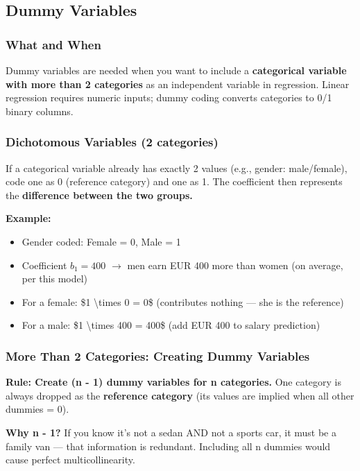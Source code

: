 \documentclass[12pt,openany]{book}
\begin{document}
\medskip


\subsection{Dummy Variables}


\subsubsection{What and When}


Dummy variables are needed when you want to include a \textbf{categorical variable with more than 2 categories} as an independent variable in regression. Linear regression requires numeric inputs; dummy coding converts categories to 0/1 binary columns.

\subsubsection{Dichotomous Variables (2 categories)}


If a categorical variable already has exactly 2 values (e.g., gender: male/female), code one as 0 (reference category) and one as 1. The coefficient then represents the \textbf{difference between the two groups.}

\textbf{Example:}
\begin{itemize}[leftmargin=*]
    \item Gender coded: Female = 0, Male = 1
    \item Coefficient \(b_1 = 400\) \(\rightarrow\) men earn EUR 400 more than women (on average, per this model)
    \item For a female: \$1 \textbackslash{}times 0 = 0\$ (contributes nothing --- she is the reference)
    \item For a male: \$1 \textbackslash{}times 400 = 400\$ (add EUR 400 to salary prediction)

\end{itemize}

\subsubsection{More Than 2 Categories: Creating Dummy Variables}


\textbf{Rule: Create (n - 1) dummy variables for n categories.} One category is always dropped as the \textbf{reference category} (its values are implied when all other dummies = 0).

\textbf{Why n - 1?} If you know it's not a sedan AND not a sports car, it must be a family van --- that information is redundant. Including all n dummies would cause perfect multicollinearity.
\end{document}
